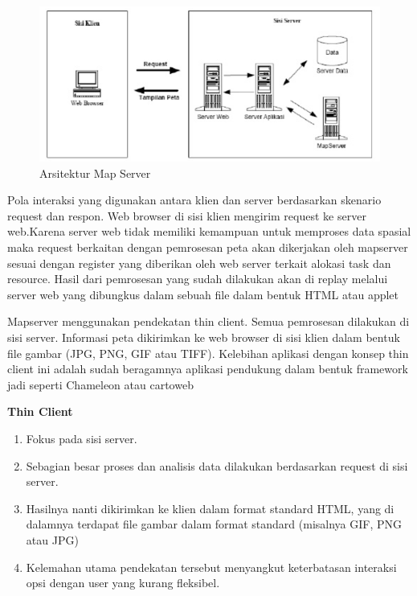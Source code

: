 \begin{figure}[ht]
\centering
\includegraphics[width=1\textwidth]{pictures/arsitektur_map_server}
\caption{Arsitektur Map Server}
\label{arsitektur_map_server}
\end{figure}

Pola interaksi yang digunakan antara klien dan server berdasarkan skenario request dan respon. Web browser di sisi klien mengirim request ke server web.Karena server web tidak memiliki kemampuan untuk memproses data spasial maka request berkaitan dengan pemrosesan peta akan dikerjakan oleh mapserver sesuai dengan register yang diberikan oleh web server terkait alokasi task dan resource.
Hasil dari pemrosesan yang sudah dilakukan akan di replay melalui server web yang dibungkus dalam sebuah file dalam bentuk HTML atau applet

Mapserver menggunakan pendekatan thin client.
Semua pemrosesan dilakukan di sisi server. Informasi peta dikirimkan ke web browser di sisi klien dalam bentuk file gambar (JPG, PNG, GIF atau TIFF). Kelebihan aplikasi dengan konsep thin client ini adalah sudah beragamnya aplikasi pendukung dalam bentuk framework jadi seperti Chameleon atau cartoweb \cite{walter2018web}


\subitem \textbf{Thin Client}
\begin{enumerate}
\item Fokus pada sisi server.
\item Sebagian besar proses dan analisis data dilakukan berdasarkan request di sisi server.
\item Hasilnya nanti dikirimkan ke klien dalam format standard HTML, yang di dalamnya terdapat file gambar dalam format standard (misalnya GIF, PNG atau JPG)
\item Kelemahan utama pendekatan tersebut menyangkut keterbatasan interaksi opsi dengan user yang kurang fleksibel.
\end{enumerate}
